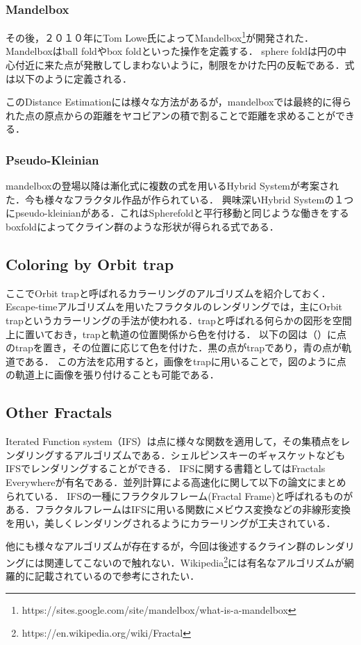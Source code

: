 \subsubsection{Mandelbox}
その後，２０１０年にTom Lowe氏によってMandelbox\footnote{https://sites.google.com/site/mandelbox/what-is-a-mandelbox}が開発された．
Mandelboxはball foldやbox foldといった操作を定義する．
sphere foldは円の中心付近に来た点が発散してしまわないように，制限をかけた円の反転である．式は以下のように定義される．

このDistance Estimationには様々な方法があるが，mandelboxでは最終的に得られた点の原点からの距離をヤコビアンの積で割ることで距離を求めることができる．


\subsubsection{Pseudo-Kleinian}

mandelboxの登場以降は漸化式に複数の式を用いるHybrid Systemが考案された．今も様々なフラクタル作品が作られている．
興味深いHybrid Systemの１つにpseudo-kleinianがある．これはSpherefoldと平行移動と同じような働きをするboxfoldによってクライン群のような形状が得られる式である．

\subsection{Coloring by Orbit trap}

ここでOrbit trapと呼ばれるカラーリングのアルゴリズムを紹介しておく．Escape-timeアルゴリズムを用いたフラクタルのレンダリングでは，主にOrbit trapというカラーリングの手法が使われる．trapと呼ばれる何らかの図形を空間上に置いておき，trapと軌道の位置関係から色を付ける．
以下の図は（）に点のtrapを置き，その位置に応じて色を付けた．黒の点がtrapであり，青の点が軌道である．
この方法を応用すると，画像をtrapに用いることで，図のように点の軌道上に画像を張り付けることも可能である．

\subsection{Other Fractals}

Iterated Function system（IFS）は点に様々な関数を適用して，その集積点をレンダリングするアルゴリズムである．シェルピンスキーのギャスケットなどもIFSでレンダリングすることができる．
IFSに関する書籍としてはFractals Everywhere\cite{fractalsEverywhere}が有名である．並列計算による高速化に関して以下の論文にまとめられている\cite{highPerformanceIFS}\cite{GPUIFS}．
IFSの一種にフラクタルフレーム(Fractal Frame)\cite{fractalFrame}と呼ばれるものがある．フラクタルフレームはIFSに用いる関数にメビウス変換などの非線形変換を用い，美しくレンダリングされるようにカラーリングが工夫されている．

他にも様々なアルゴリズムが存在するが，今回は後述するクライン群のレンダリングには関連してこないので触れない．Wikipedia\footnote{https://en.wikipedia.org/wiki/Fractal}には有名なアルゴリズムが網羅的に記載されているので参考にされたい．

